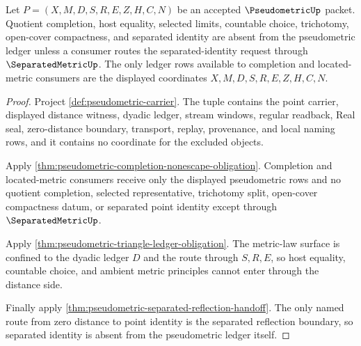 \begin{theorem}
\label{thm:pseudometric-ledger-nonescape-obligation}
Let $P=(X,M,D,S,R,E,Z,H,C,N)$ be an accepted $\PseudometricUp$ packet. Quotient completion, host equality, selected limits, countable choice, trichotomy, open-cover compactness, and separated identity are absent from the pseudometric ledger unless a consumer routes the separated-identity request through $\SeparatedMetricUp$. The only ledger rows available to completion and located-metric consumers are the displayed coordinates $X,M,D,S,R,E,Z,H,C,N$.
\end{theorem}
\begin{proof}
Project \autoref{def:pseudometric-carrier}. The tuple contains the point carrier, displayed distance witness, dyadic ledger, stream windows, regular readback, Real seal, zero-distance boundary, transport, replay, provenance, and local naming rows, and it contains no coordinate for the excluded objects.

Apply \autoref{thm:pseudometric-completion-nonescape-obligation}. Completion and located-metric consumers receive only the displayed pseudometric rows and no quotient completion, selected representative, trichotomy split, open-cover compactness datum, or separated point identity except through $\SeparatedMetricUp$.

Apply \autoref{thm:pseudometric-triangle-ledger-obligation}. The metric-law surface is confined to the dyadic ledger $D$ and the route through $S,R,E$, so host equality, countable choice, and ambient metric principles cannot enter through the distance side.

Finally apply \autoref{thm:pseudometric-separated-reflection-handoff}. The only named route from zero distance to point identity is the separated reflection boundary, so separated identity is absent from the pseudometric ledger itself.
\end{proof}

